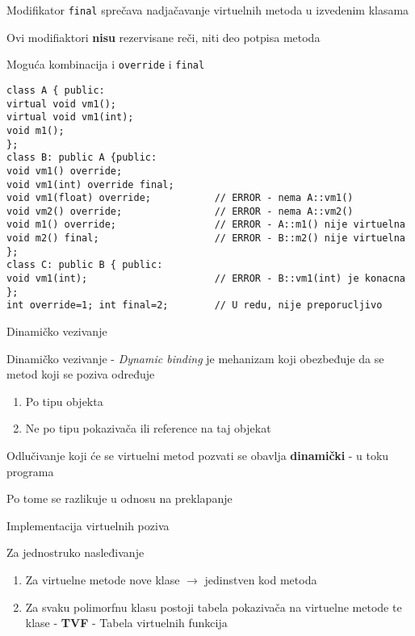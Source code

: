 \documentclass{article}
\newenvironment{xitemize}{%
    
    \itemize
    \larger
}{%
    \enditemize
}
\let\olditemize\itemize
\let\endolditemize\enditemize
\renewenvironment{itemize}{%
    \smaller
    \olditemize
}{%
    \endolditemize
}
\providecommand{\inlinecode}[1]{\texttt{#1}}
\begin{document}
\begin{xitemize}
\begin{itemize}
    \item Modifikator \inlinecode{final} sprečava nadjačavanje virtuelnih metoda u izvedenim klasama
    \item Ovi modifiaktori \textbf{nisu} rezervisane reči, niti deo potpisa metoda
    \item Moguća kombinacija i \inlinecode{override} i \inlinecode{final}
    \begin{lstlisting}
class A { public:
virtual void vm1();
virtual void vm1(int);
void m1();
};
class B: public A {public:
void vm1() override;
void vm1(int) override final;
void vm1(float) override;           // ERROR - nema A::vm1()
void vm2() override;                // ERROR - nema A::vm2()
void m1() override;                 // ERROR - A::m1() nije virtuelna
void m2() final;                    // ERROR - B::m2() nije virtuelna
};
class C: public B { public:
void vm1(int);                      // ERROR - B::vm1(int) je konacna
};
int override=1; int final=2;        // U redu, nije preporucljivo
    \end{lstlisting}
\end{itemize}
\item Dinamičko vezivanje
\begin{itemize}
    \item Dinamičko vezivanje - \textit{Dynamic binding} je mehanizam koji obezbeđuje da se metod koji se poziva određuje 
    \begin{enumerate}
        \item Po tipu objekta
        \item Ne po tipu pokazivača ili reference na taj objekat
    \end{enumerate}
    \item Odlučivanje koji će se virtuelni metod pozvati se obavlja \textbf{dinamički} - u toku programa
    \item Po tome se razlikuje u odnosu na preklapanje
\end{itemize}
\item Implementacija virtuelnih poziva
\begin{itemize}
    \item Za jednostruko nasleđivanje
    \begin{enumerate}
        \item Za virtuelne metode nove klase $\rightarrow$ jedinstven kod metoda
        \item Za svaku polimorfnu klasu postoji tabela pokazivača na virtuelne metode te klase - \textbf{TVF} - Tabela virtuelnih funkcija

\end{enumerate}
\end{itemize}
\end{xitemize}
\end{document}
